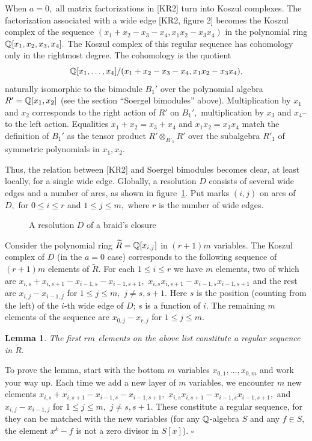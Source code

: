 \documentclass[12pt]{article}
\newtheorem{lemma}{Lemma}
\begin{document}
When $a=0,$ all matrix factorizations in [KR2] turn into 
Koszul complexes. The factorization associated with a wide edge 
[KR2, figure 2] becomes the Koszul complex of the 
sequence $(x_1 +x_2 -x_3 -x_4, x_1x_2-x_3x_4)$ in 
the polynomial ring $\mathbb Q[x_1, x_2, x_3 , x_4].$ The Koszul 
complex of this regular sequence has cohomology only in the rightmost 
degree. The cohomology is the quotient 
$$ \mathbb Q[x_1,\dots, x_4]/( x_1 +x_2 -x_3 -x_4, x_1x_2-x_3x_4),$$
naturally isomorphic to the bimodule $B_1'$ over the 
polynomial algebra $R'=\mathbb Q[x_1, x_2]$ (see the section ``Soergel bimodules''
above). Multiplication by $x_1$ and $x_2$ corresponds to the right action 
of $R'$ on $B_1',$ multiplication by  $x_3$ and $x_4$--to the left action.   
Equalities $x_1+x_2=x_3+x_4$ and $x_1x_2=x_3x_4$ match the 
definition of $B_1'$ as the tensor product $R'\otimes_{R'_1} R'$ over 
the subalgebra $R'_1$ of symmetric polynomials in $x_1,x_2.$ 

Thus, the relation between [KR2] and Soergel bimodules becomes clear, 
at least locally, for a single wide edge. Globally, a resolution $D$ 
consists of several wide edges and a number of arcs, as shown in 
figure~\ref{comp}. Put marks 
$(i,j)$ on arcs of $D,$ for $0\le i\le r$ and  $1\le j\le m,$ 
where $r$ is the number of wide edges. 

\begin{figure}  \caption{A resolution $D$ of 
a braid's closure} \label{comp}
\end{figure} 

Consider the polynomial 
ring $\widetilde{R}=\mathbb Q[x_{i,j}]$ in $(r+1)m$ variables. 
The Koszul complex of $D$ (in the $a=0$ case) corresponds to the 
following sequence of $(r+1)m$ elements of $\widetilde{R}.$ 
For each $1\le i\le r$ we have $m$ elements, two of which 
are $x_{i,s}+x_{i,s+1}-x_{i-1,s}-x_{i-1,s+1},$ 
$ x_{i,s} x_{i,s+1}-x_{i-1,s} x_{i-1,s+1}$ and the rest are 
$x_{i,j}-x_{i-1,j}$ for $1\le j\le m,$ $j\not= s, s+1.$ Here $s$ 
is the position (counting from the left) 
of the $i$-th wide edge of $D$; $s$ is a function of $i.$ 
The remaining $m$ elements of the sequence are 
$x_{0,j}-x_{r,j}$  for $1\le j\le m.$ 

\begin{lemma} The first $rm$ elements on the above list 
constitute a regular sequence in $\widetilde{R}.$ 
\end{lemma} 

To prove the lemma, start with the bottom $m$ variables 
$x_{0,1}, \dots, x_{0,m}$ and work your way up. Each 
time we add a new layer of $m$ variables, we encounter $m$ 
new elements 
$x_{i,s}+x_{i,s+1}-x_{i-1,s}-x_{i-1,s+1},$  
$ x_{i,s} x_{i,s+1}-x_{i-1,s} x_{i-1,s+1},$ and  
$x_{i,j}-x_{i-1,j}$ for $1\le j\le m,$ $j\not= s, s+1.$
These constitute a regular sequence, for they can be matched 
with the  new variables (for any $\mathbb Q$-algebra $S$ and 
any $f\in S,$ the element $x^k-f$ is not a zero divisor 
in $S[x]$). $\square$ 
\end{document}
